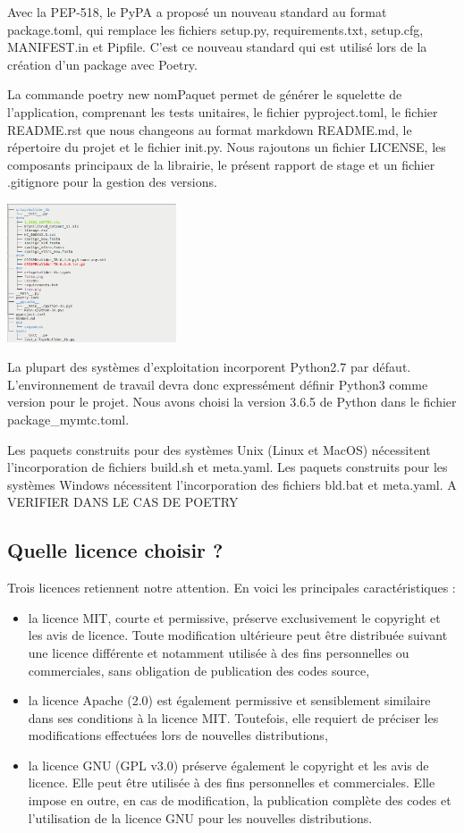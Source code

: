 \documentclass[twoside,a4paper,11pt,frenchb,openany]{report}
\begin{document}
Avec la PEP-518, le PyPA a proposé un nouveau standard au format package.toml, qui remplace les fichiers setup.py, requirements.txt, setup.cfg, MANIFEST.in et Pipfile. C'est ce nouveau standard qui est utilisé lors de la création d'un package avec Poetry.

La commande poetry new nomPaquet permet de générer le squelette de l'application, comprenant les tests unitaires, le fichier pyproject.toml, le fichier README.rst que nous changeons au format markdown README.md, le répertoire du projet et le fichier init.py. Nous rajoutons un fichier LICENSE, les composants principaux de la librairie, le présent rapport de stage et un fichier .gitignore pour la gestion des versions.
	
\includegraphics[width=5cm]{package_tree.png}

	La plupart des systèmes d'exploitation incorporent Python2.7 par défaut. L'environnement de travail devra donc expressément définir Python3 comme version pour le projet. Nous avons choisi la version 3.6.5 de Python dans le fichier package\_mymtc.toml.

Les paquets construits pour des systèmes Unix (Linux et MacOS) nécessitent l'incorporation de fichiers build.sh et meta.yaml. Les paquets construits pour les systèmes Windows nécessitent l'incorporation des fichiers bld.bat et meta.yaml. A VERIFIER DANS LE CAS DE POETRY


\subsection{Quelle licence choisir ?}
	
Trois licences retiennent notre attention. En voici les principales caractéristiques :
\begin{itemize}
\item	la licence MIT, courte et permissive, préserve exclusivement le copyright et les avis de licence. Toute modification ultérieure peut être distribuée suivant une licence différente et notamment utilisée à des fins personnelles ou commerciales, sans obligation de publication des codes source,
\item	la licence Apache (2.0) est également permissive et sensiblement similaire dans ses conditions à la licence MIT. Toutefois, elle requiert de préciser les modifications effectuées lors de nouvelles distributions,
\item	la licence GNU (GPL v3.0) préserve également le copyright et les avis de licence. Elle peut être utilisée à des fins personnelles et commerciales. Elle impose en outre, en cas de modification, la publication complète des codes et l'utilisation de la licence GNU pour les nouvelles distributions.
\end{itemize}
\end{document}
